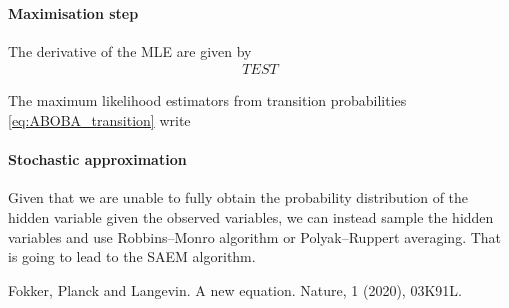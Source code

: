 \documentclass{article}
\numberwithin{equation}{section} %
\newcommand{\1}{\mathds{1}} %
\begin{document}
\paragraph{Maximisation step}

The derivative of the MLE are given by
\begin{align}
TEST
\end{align}

The maximum likelihood estimators from transition probabilities \eqref{eq:ABOBA_transition} write


\paragraph{Stochastic approximation}

Given that we are unable to fully obtain the probability distribution of the hidden variable given the observed variables, we can instead sample the hidden variables and use Robbins–Monro algorithm or Polyak–Ruppert averaging. That is going to lead to the SAEM algorithm.

\begin{thebibliography}{10}

Fokker, Planck and Langevin. A new equation. Nature, 1 (2020), 03K91L.

\end{thebibliography}
%
%
\end{document}
